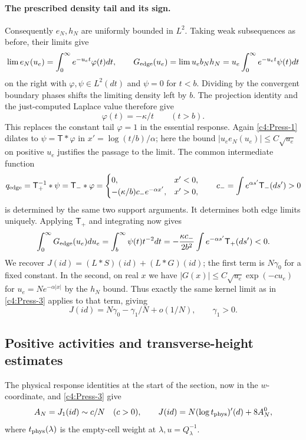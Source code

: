 \paragraph{The prescribed density tail and its sign.}
Consequently \(e_N,h_N\) are uniformly bounded in \(L^2\). Taking weak
subsequences as before, their limits give
\[
 \lim e_N(u_e)=\int_0^\infty e^{-u_e t}\varphi(t)dt,\qquad
 G_{\rm edge}(u_e)=\lim u_e b_N h_N=u_e\int_0^\infty e^{-u_e t}\psi(t)dt
\]
on the right with \(\varphi,\psi\in L^2(dt)\) and \(\psi=0\) for
\(t<b\). Dividing by the convergent boundary phases shifts the limiting
density left by \(b\). The projection identity and the just-computed
Laplace value therefore give
\[
                   \varphi(t)=-\kappa/t\qquad(t>b).
\]
This replaces the constant tail \(\varphi=1\) in the essential response.
Again \eqref{c4:Press-1} dilates to \(\psi=\mathsf T*\varphi\) in
\(x'=\log(t/b)/\alpha\); here the bound
\(|u_e e_N(u_e)|\le C\sqrt{u_e}\) on positive \(u_e\) justifies the
passage to the limit. The common intermediate function
\[
 q_{\rm edge}=\mathsf T_+^{-1}*\psi=\mathsf T_-*\varphi
   =\begin{cases}
       0,&x'<0,\\
       -(\kappa/b)c_-e^{-\alpha x'},&x'>0,
     \end{cases}
 \qquad c_-=\int e^{\alpha s'}\mathsf T_-(ds')>0
\]
is determined by the same two support arguments. It determines both edge
limits uniquely. Applying \(\mathsf T_+\) and integrating now gives
\[
        \int_0^\infty G_{\rm edge}(u_e)du_e=\int_b^\infty \psi(t)t^{-2}dt
             =-\frac{\kappa c_-}{2 b^2}\int e^{-\alpha s'}\mathsf T_+(ds')<0 .
\]
We recover \(J(id)=(L*S)(id)+(L*G)(id)\); the first term is \(N\gamma_0\) for a fixed constant. In the second, on real \(x\) we have \(|G(x)|\le C\sqrt{u_e}\exp(-c u_e)\) for \(u_e=N e^{-\alpha|x|}\) by the \(h_N\) bound. Thus exactly the same kernel limit as in \eqref{c4:Press-3} applies to that term, giving
\begin{equation}
                       J(id)=N\gamma_0-\gamma_1/N+o(1/N),\qquad \gamma_1>0 .  \label{c4:Press-5}
\end{equation}

\subsection{Positive activities and transverse-height estimates}\label{c4:transverse}

The physical response identities at the start of the section, now in
the \(w\)-coordinate, and \eqref{c4:Press-3} give
\begin{equation}
             A_N=J_1(id)\sim c/N\quad(c>0),\qquad
             J(id)=N(\log t_{\rm phys})'(d)+8 A_N^0,                          \label{c4:Press-6}
\end{equation}
where \(t_{\rm phys}(\lambda)\) is the empty-cell weight at \(\lambda,u=Q_\lambda^{-1}\).

